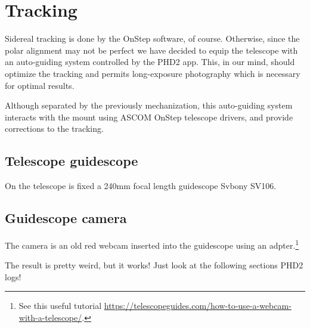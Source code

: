 \section{Tracking}
\label{sec:tracking}
Sidereal tracking is done by the OnStep software, of course.
Otherwise, since the polar alignment may not be perfect we have decided to equip the telescope with an auto-guiding system controlled by the PHD2 app.
This, in our mind, should optimize the tracking and permits long-exposure photography which is necessary for optimal results.

Although separated by the previously mechanization, this auto-guiding system interacts with the mount using ASCOM OnStep telescope drivers, and provide corrections to the tracking.

\subsection{Telescope guidescope}
On the telescope is fixed a 240mm focal length guidescope Svbony SV106.

\subsection{Guidescope camera}
The camera is an old red webcam inserted into the guidescope using an adpter.\footnote{See this useful tutorial \url{https://telescopeguides.com/how-to-use-a-webcam-with-a-telescope/}.}

The result is pretty weird, but it works!
Just look at the following sections PHD2 logs!